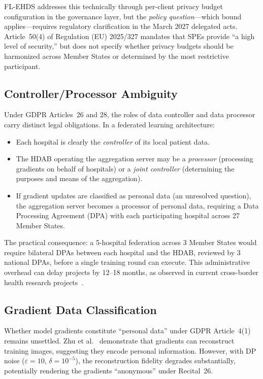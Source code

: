 \documentclass[conference]{IEEEtran}
\begin{document}
FL-EHDS addresses this technically through per-client privacy budget configuration in the governance layer, but the \textit{policy question}---which bound applies---requires regulatory clarification in the March 2027 delegated acts. Article~50(4) of Regulation (EU) 2025/327 mandates that SPEs provide ``a high level of security,'' but does not specify whether privacy budgets should be harmonized across Member States or determined by the most restrictive participant.

\subsection{Controller/Processor Ambiguity}

Under GDPR Articles~26 and 28, the roles of data controller and data processor carry distinct legal obligations. In a federated learning architecture:
\begin{itemize}
    \item Each hospital is clearly the \textit{controller} of its local patient data.
    \item The HDAB operating the aggregation server may be a \textit{processor} (processing gradients on behalf of hospitals) or a \textit{joint controller} (determining the purposes and means of the aggregation).
    \item If gradient updates are classified as personal data (an unresolved question), the aggregation server becomes a processor of personal data, requiring a Data Processing Agreement (DPA) with each participating hospital across 27 Member States.
\end{itemize}

The practical consequence: a 5-hospital federation across 3 Member States would require bilateral DPAs between each hospital and the HDAB, reviewed by 3 national DPAs, before a single training round can execute. This administrative overhead can delay projects by 12--18 months, as observed in current cross-border health research projects~\cite{frohlich2025reality}.

\subsection{Gradient Data Classification}

Whether model gradients constitute ``personal data'' under GDPR Article~4(1) remains unsettled. Zhu et al.~\cite{zhu2019deep} demonstrate that gradients can reconstruct training images, suggesting they encode personal information. However, with DP noise ($\varepsilon = 10$, $\delta = 10^{-5}$), the reconstruction fidelity degrades substantially, potentially rendering the gradients ``anonymous'' under Recital~26.
\end{document}
